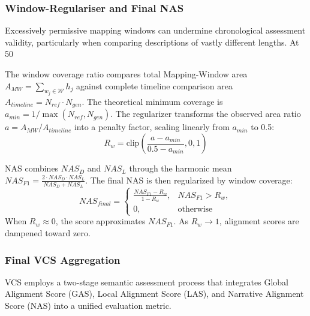 \documentclass[main.tex]{subfiles}
\begin{document}
\subsubsection{Window-Regulariser and Final NAS}
Excessively permissive mapping windows can undermine chronological assessment validity, particularly when comparing descriptions of vastly different lengths. At 50%

The window coverage ratio compares total Mapping-Window area $A_{MW} = \sum_{w_j \in \mathcal{W}} h_j$ against complete timeline comparison area $A_{timeline} = N_{ref} \cdot N_{gen}$. The theoretical minimum coverage is $a_{min} = 1/\max(N_{ref}, N_{gen})$. The regularizer transforms the observed area ratio $a = A_{MW}/A_{timeline}$ into a penalty factor, scaling linearly from $a_{min}$ to 0.5:
\begin{equation}
R_w = \text{clip}\left(\frac{a - a_{min}}{0.5 - a_{min}}, 0, 1\right)
\end{equation}

NAS combines $NAS_D$ and $NAS_L$ through the harmonic mean $NAS_{F1} = \frac{2 \cdot NAS_D \cdot NAS_L}{NAS_D + NAS_L}$. The final NAS is then regularized by window coverage:
\begin{equation}
\boxed{NAS_{final} = \begin{cases}
\frac{NAS_{F1} - R_w}{1 - R_w}, & NAS_{F1} > R_w, \\
0, & \text{otherwise}
\end{cases}}
\end{equation}
When $R_w \approx 0$, the score approximates $NAS_{F1}$. As $R_w \to 1$, alignment scores are dampened toward zero.


\subsubsection{Final VCS Aggregation}
VCS employs a two-stage semantic assessment process that integrates Global Alignment Score (GAS), Local Alignment Score (LAS), and Narrative Alignment Score (NAS) into a unified evaluation metric.
\end{document}
